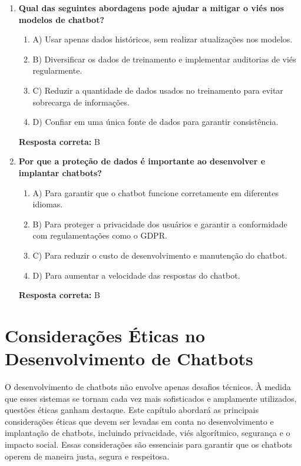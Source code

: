 \documentclass[14pt,a4paper,oneside]{book}
\begin{document}
\begin{enumerate}
	\item \textbf{Qual das seguintes abordagens pode ajudar a mitigar o viés nos modelos de chatbot?}
	\begin{enumerate}[label=\alph*)]
		\item A) Usar apenas dados históricos, sem realizar atualizações nos modelos.
		\item B) Diversificar os dados de treinamento e implementar auditorias de viés regularmente.
		\item C) Reduzir a quantidade de dados usados no treinamento para evitar sobrecarga de informações.
		\item D) Confiar em uma única fonte de dados para garantir consistência.
	\end{enumerate}
	\vspace{5mm}
	\textbf{Resposta correta:} B
	
	\item \textbf{Por que a proteção de dados é importante ao desenvolver e implantar chatbots?}
	\begin{enumerate}[label=\alph*)]
		\item A) Para garantir que o chatbot funcione corretamente em diferentes idiomas.
		\item B) Para proteger a privacidade dos usuários e garantir a conformidade com regulamentações como o GDPR.
		\item C) Para reduzir o custo de desenvolvimento e manutenção do chatbot.
		\item D) Para aumentar a velocidade das respostas do chatbot.
	\end{enumerate}
	\vspace{5mm}
	\textbf{Resposta correta:} B
	
\end{enumerate}


\chapter{Considerações Éticas no Desenvolvimento de Chatbots}

O desenvolvimento de chatbots não envolve apenas desafios técnicos. À medida que esses sistemas se tornam cada vez mais sofisticados e amplamente utilizados, questões éticas ganham destaque. Este capítulo abordará as principais considerações éticas que devem ser levadas em conta no desenvolvimento e implantação de chatbots, incluindo privacidade, viés algorítmico, segurança e o impacto social. Essas considerações são essenciais para garantir que os chatbots operem de maneira justa, segura e respeitosa.
\end{document}
